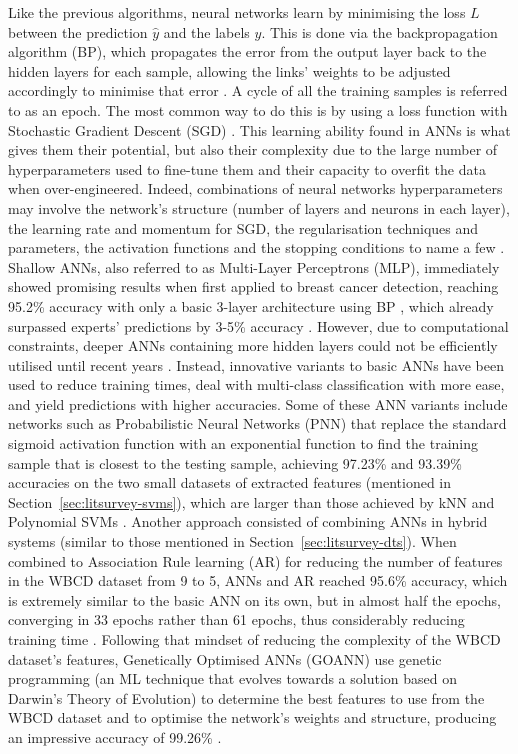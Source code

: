 Like the previous algorithms, neural networks learn by minimising the loss $L$ between the prediction $\hat{y}$ and the labels $y$. This is done via the backpropagation algorithm (BP), which propagates the error from the output layer back to the hidden layers for each sample, allowing the links' weights to be adjusted accordingly to minimise that error \citep{russell2002artificial}. A cycle of all the training samples is  referred to as an epoch. The most common way to do this is by using a loss function with Stochastic Gradient Descent (SGD) \citep{Litjens2017}. This learning ability found in ANNs is what gives them their potential, but also their complexity due to the large number of hyperparameters used to fine-tune them and their capacity to overfit the data when over-engineered. Indeed, combinations of neural networks hyperparameters may involve the network's structure (number of layers and neurons in each layer), the learning rate and momentum for SGD, the regularisation techniques and parameters, the activation functions and the stopping conditions to name a few \citep{sklearn-MLP-2019}.\\
 
Shallow ANNs, also referred to as Multi-Layer Perceptrons (MLP), immediately showed promising results when first applied to breast cancer detection, reaching 95.2\% accuracy with only a basic 3-layer architecture using BP \citep{Wu1993}, which already surpassed experts' predictions by 3-5\% accuracy \citep{Yue2018}. However, due to computational constraints, deeper ANNs containing more hidden layers could not be efficiently utilised until recent years \citep{Litjens2017}. Instead, innovative variants to basic ANNs have been used to reduce training times, deal with multi-class classification with more ease, and yield predictions  with higher accuracies. Some of these ANN variants include networks such as Probabilistic Neural Networks (PNN) that replace the standard sigmoid activation function with an exponential function to find the training sample that is closest to the testing sample, achieving 97.23\% and 93.39\% accuracies on the two small datasets of extracted features (mentioned in Section~\ref{sec:litsurvey-svms}), which are larger than those achieved by kNN and Polynomial SVMs \citep{Osareh2010}. Another approach consisted of combining ANNs in hybrid systems (similar to those mentioned in Section~\ref{sec:litsurvey-dts}). When combined to Association Rule learning (AR) for reducing the number of features in the WBCD dataset from 9 to 5, ANNs and AR reached 95.6\% accuracy, which is extremely similar to the basic ANN on its own, but in almost half the epochs, converging in 33 epochs rather than 61 epochs, thus considerably reducing training time \citep{Karabatak2009}. Following that mindset of reducing the complexity of the WBCD dataset's features, Genetically Optimised ANNs (GOANN) use genetic programming (an ML technique that evolves towards a solution based on Darwin's Theory of Evolution) to determine the best features to use from the WBCD dataset and to optimise the network's weights and structure, producing an impressive accuracy of 99.26\% \citep{Bhardwaj2015}.


